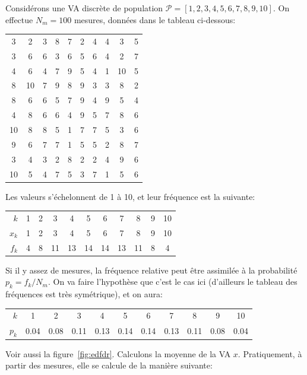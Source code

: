 \documentclass[main.tex]{subfiles}
\begin{document}
Considérons une VA discrète de population $\mathcal{P}=[1,2,3,4,5,6,7,8,9,10]$. On effectue $N_m=100$ mesures, données dans le tableau ci-dessous:
\begin{center}
    \begin{tabular}{cccccccccc}
        3  & 2  & 3 & 8 & 7 & 2 & 4 & 4 & 3  & 5 \\
        3  & 6  & 6 & 3 & 6 & 5 & 6 & 4 & 2  & 7 \\
        4  & 6  & 4 & 7 & 9 & 5 & 4 & 1 & 10 & 5 \\
        8  & 10 & 7 & 9 & 8 & 9 & 3 & 3 & 8  & 2 \\
        8  & 6  & 6 & 5 & 7 & 9 & 4 & 9 & 5  & 4 \\
        4  & 8  & 6 & 6 & 4 & 9 & 5 & 7 & 8  & 6 \\
        10 & 8  & 8 & 5 & 1 & 7 & 7 & 5 & 3  & 6 \\
        9  & 6  & 7 & 7 & 1 & 5 & 5 & 2 & 8  & 7 \\
        3  & 4  & 3 & 2 & 8 & 2 & 2 & 4 & 9  & 6 \\
        10 & 5  & 4 & 7 & 5 & 3 & 7 & 1 & 5  & 6
    \end{tabular}
\end{center}
Les valeurs s'échelonnent de 1 à 10, et leur fréquence est la suivante:
\begin{center}
    \begin{tabular}{r|cccccccccc}
        $k$   & 1 & 2 & 3  & 4  & 5  & 6  & 7  & 8  & 9 & 10 \\
        $x_k$ & 1 & 2 & 3  & 4  & 5  & 6  & 7  & 8  & 9 & 10 \\
        $f_k$ & 4 & 8 & 11 & 13 & 14 & 14 & 13 & 11 & 8 & 4
    \end{tabular}
\end{center}
Si il y assez de mesures, la fréquence relative peut être assimilée à la probabilité $p_k=f_k/N_m$. On va faire l'hypothèse que c'est le cas ici (d'ailleurs le tableau des fréquences est très symétrique), et on aura:
\begin{center}
    \begin{tabular}{r|cccccccccc}
        $k$   & 1    & 2    & 3    & 4    & 5    & 6    & 7    & 8    & 9    & 10   \\
        $p_k$ & 0.04 & 0.08 & 0.11 & 0.13 & 0.14 & 0.14 & 0.13 & 0.11 & 0.08 & 0.04
    \end{tabular}
\end{center}
Voir aussi la figure~\ref{fig:edfdr}. Calculons la moyenne de la VA $x$. Pratiquement, à partir des mesures, elle se calcule de la manière suivante:
\end{document}
